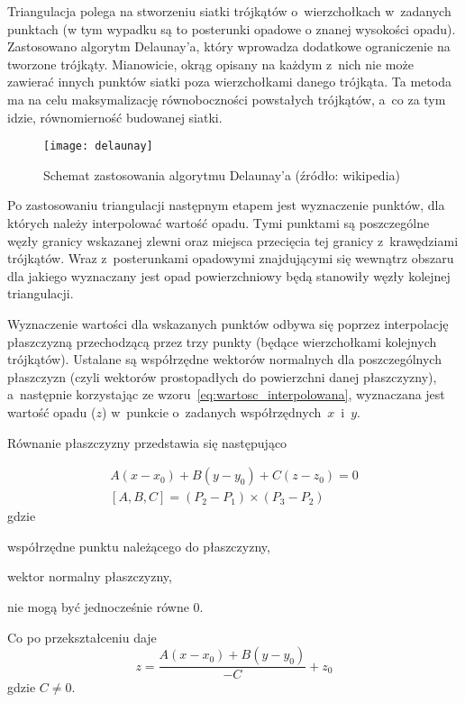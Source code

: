 Triangulacja polega na stworzeniu siatki trójkątów o~wierzchołkach w~zadanych punktach (w tym wypadku są to posterunki opadowe o znanej wysokości opadu). Zastosowano algorytm Delaunay'a, który wprowadza dodatkowe ograniczenie na tworzone trójkąty. Mianowicie, okrąg opisany na każdym z~nich nie może zawierać innych punktów siatki poza wierzchołkami danego trójkąta. Ta metoda ma na celu maksymalizację równoboczności powstałych trójkątów, a~co za tym idzie, równomierność budowanej siatki.

\begin{figure}[!ht]
	\centering
	\texttt{[image: delaunay]}
	\caption{Schemat zastosowania algorytmu Delaunay'a (źródło: wikipedia)}
	\label{fig:delaunay}
\end{figure}

Po zastosowaniu triangulacji następnym etapem jest wyznaczenie punktów, dla których należy interpolować wartość opadu. Tymi punktami są poszczególne węzły granicy wskazanej zlewni oraz miejsca przecięcia tej granicy z~krawędziami trójkątów. Wraz z~posterunkami opadowymi znajdującymi się wewnątrz obszaru dla jakiego wyznaczany jest opad powierzchniowy będą stanowiły węzły kolejnej triangulacji.

Wyznaczenie wartości dla wskazanych punktów odbywa się poprzez interpolację płaszczyzną przechodzącą przez trzy punkty (będące wierzchołkami kolejnych trójkątów). Ustalane są współrzędne wektorów normalnych dla poszczególnych płaszczyzn (czyli wektorów prostopadłych do powierzchni danej płaszczyzny), a~następnie korzystając ze wzoru~\ref{eq:wartosc_interpolowana}, wyznaczana jest wartość opadu ($z$) w~punkcie o~zadanych współrzędnych~$x$~i~$y$.

Równanie płaszczyzny przedstawia się następująco

\begin{equation}
\begin{gathered}
A(x - x_0) + B(y - y_0) + C(z - z_0) = 0 \\
[A, B, C] = (P_2 - P_1) \times (P_3 - P_2)
\label{eq:rownanie_plaszczyzny}
\end{gathered}
\end{equation}
gdzie
\begin{description}[leftmargin=3cm, itemsep=0cm, labelsep=0cm]
	\item[$x_0, y_0, z_0$] współrzędne punktu należącego do płaszczyzny,
	\item[$A, B, C$] wektor normalny płaszczyzny, %
	\item[$A, B, C$] nie mogą być jednocześnie równe 0.
\end{description}
%
Co po przekształceniu daje
\begin{equation}
\label{eq:wartosc_interpolowana}
	z = \frac{A(x - x_0) + B(y - y_0)}{-C} + z_0
\end{equation}
gdzie $C \neq 0$.


